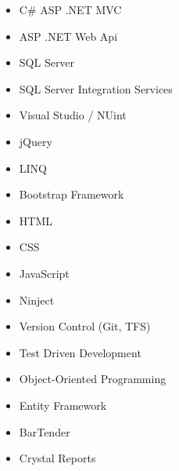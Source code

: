 \descriptionstyle
{
\begin{multicols}{3}
\begin{itemize}[leftmargin=2ex, nosep, noitemsep]
\item {C\# ASP .NET MVC}
\item {ASP .NET Web Api}
\item {SQL Server}
\item {SQL Server Integration Services}
\item {Visual Studio / NUint}
\item {jQuery}
\item {LINQ}
\item {Bootstrap Framework}
\item {HTML}
\item {CSS}
\item {JavaScript}
\item {Ninject}
\item {Version Control (Git, TFS)}
\item {Test Driven Development}
\item {Object-Oriented Programming}
\item {Entity Framework}
\item {BarTender}
\item {Crystal Reports}
\end{itemize}
\end{multicols}
}
